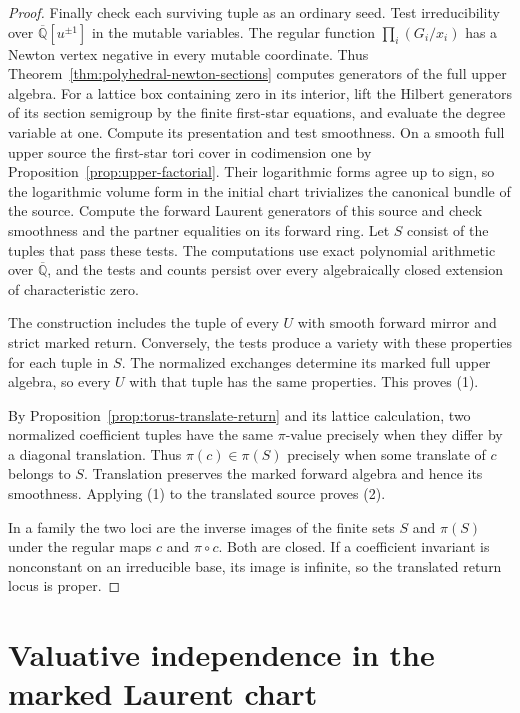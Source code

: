 \documentclass[11pt,reqno]{amsart}
\numberwithin{equation}{section}
\theoremstyle{definition}
\theoremstyle{remark}
\begin{document}
\begin{proof}
Finally check each surviving tuple as an ordinary seed. Test
irreducibility over \(\overline{\mathbb Q}[u^{\pm1}]\) in the
mutable variables. The regular function \(\prod_i(G_i/x_i)\) has a
Newton vertex negative in every mutable coordinate. Thus
Theorem~\ref{thm:polyhedral-newton-sections} computes generators of
the full upper algebra. For a lattice box containing zero in its
interior, lift the Hilbert generators of its section semigroup by
the finite first-star equations, and evaluate the degree variable at
one. Compute its presentation and test smoothness. On a smooth
full upper source the first-star tori cover in codimension one by
Proposition~\ref{prop:upper-factorial}. Their logarithmic forms agree
up to sign, so the logarithmic volume form in the initial chart
trivializes the canonical bundle of the source.
Compute the forward Laurent generators of this source and check
smoothness and the partner equalities on its forward ring. Let \(S\)
consist of the tuples that pass these tests. The computations use
exact polynomial arithmetic over \(\overline{\mathbb Q}\), and the
tests and counts persist over every algebraically closed extension
of characteristic zero.

The construction includes the tuple of every \(U\) with smooth
forward mirror and strict marked return. Conversely, the tests produce
a variety with these properties for each tuple in \(S\).
The normalized exchanges determine its marked full upper algebra,
so every \(U\) with that tuple has the same properties.
This proves (1).

By Proposition~\ref{prop:torus-translate-return} and its lattice
calculation, two normalized coefficient tuples have the same
\(\pi\)-value precisely when they differ by a diagonal translation.
Thus \(\pi(c)\in\pi(S)\) precisely when some translate of \(c\)
belongs to \(S\). Translation preserves the marked forward algebra
and hence its smoothness. Applying (1) to the translated source
proves (2).

In a family the two loci are the inverse images of the finite sets
\(S\) and \(\pi(S)\) under the regular maps \(c\) and \(\pi\circ c\).
Both are closed. If a coefficient invariant is nonconstant on an
irreducible base, its image is infinite, so the translated return
locus is proper.
\end{proof}

\appendix

\section{Valuative independence in the marked Laurent chart}
\label{sec:one-sided-independence}
\end{document}

